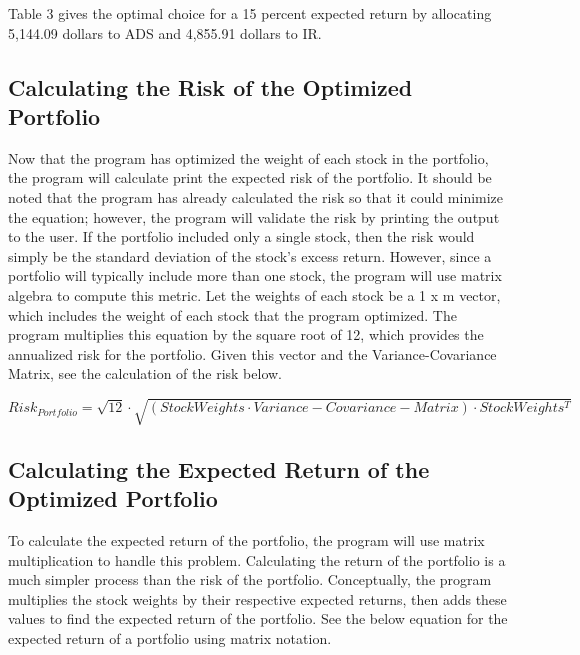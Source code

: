 \documentclass[12pt,english]{article}
\begin{document}
\begin{doublespace}
            \indent{}
            Table 3 gives the optimal choice for a 15 percent expected return by allocating 5,144.09 dollars to ADS and 4,855.91 dollars to IR.
                
        \subsection{Calculating the Risk of the Optimized Portfolio}
            
            \indent{}\indent{}
            Now that the program has optimized the weight of each stock in the portfolio, the program will calculate print the expected risk of the portfolio. It should be noted that the program has already calculated the risk so that it could minimize the equation; however, the program will validate the risk by printing the output to the user. If the portfolio included only a single stock, then the risk would simply be the standard deviation of the stock’s excess return. However, since a portfolio will typically include more than one stock, the program will use matrix algebra to compute this metric. Let the weights of each stock be a 1 x m vector, which includes the weight of each stock that the program optimized. The program multiplies this equation by the square root of 12, which provides the annualized risk for the portfolio. Given this vector and the Variance-Covariance Matrix, see the calculation of the risk below.
            
                \begin{center}
                    \begin{equation} \label{Portfolio Risk}
                        Risk_{Portfolio} = 
                        \sqrt{12} \cdot \sqrt{(StockWeights \cdot Variance-Covariance-Matrix) \cdot StockWeights^{T}}
                    \end{equation}
                \end{center}
        
        \subsection{Calculating the Expected Return of the Optimized Portfolio} 

            \indent{}\indent{}
            To calculate the expected return of the portfolio, the program will use matrix multiplication to handle this problem. Calculating the return of the portfolio is a much simpler process than the risk of the portfolio. Conceptually, the program multiplies the stock weights by their respective expected returns, then adds these values to find the expected return of the portfolio. See the below equation for the expected return of a portfolio using matrix notation.
            	

\end{doublespace}
\end{document}
